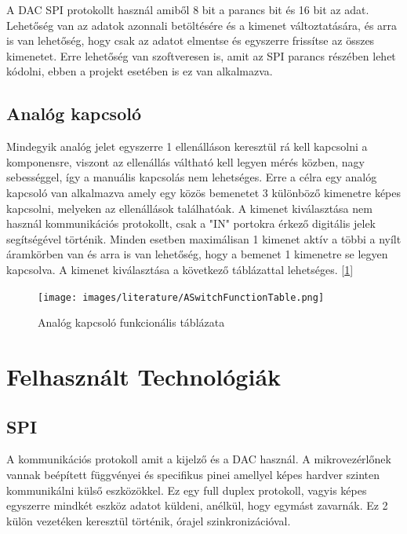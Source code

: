 A DAC SPI protokollt használ amiből 8 bit a parancs bit és 16 bit az adat.
Lehetőség van az adatok azonnali betöltésére és a kimenet változtatására, és
arra is van lehetőség, hogy csak az adatot elmentse és egyszerre frissítse az
összes kimenetet. Erre lehetőség van szoftveresen is, amit az SPI parancs
részében lehet kódolni, ebben a projekt esetében is ez van alkalmazva. 

\subsection{Analóg kapcsoló}

Mindegyik analóg jelet egyszerre 1 ellenálláson keresztül rá kell kapcsolni a komponensre,
viszont az ellenállás váltható kell legyen mérés közben, nagy sebességgel, így a manuális
kapcsolás nem lehetséges. Erre a célra egy analóg kapcsoló van alkalmazva amely egy közös
bemenetet 3 különböző kimenetre képes kapcsolni, melyeken az ellenállások találhatóak.
A kimenet kiválasztása nem használ kommunikációs protokollt, csak a "IN" portokra érkező
digitális jelek segítségével történik. Minden esetben maximálisan 1 kimenet aktív a többi
a nyílt áramkörben van és arra is van lehetőség, hogy a bemenet 1 kimenetre 
se legyen kapcsolva. A kimenet kiválasztása a következő táblázattal lehetséges.
[\ref{fig:ASwitchFuntionTable}]

\begin{figure}[h]
    \centering
    \texttt{[image: images/literature/ASwitchFunctionTable.png]}
    \caption{Analóg kapcsoló funkcionális táblázata}
    \label{fig:ASwitchFuntionTable}
\end{figure}



\section{Felhasznált Technológiák}

\subsection{SPI}

A kommunikációs protokoll amit a kijelző és a DAC használ. A mikrovezérlőnek vannak
beépített függvényei és specifikus pinei amellyel képes hardver szinten kommunikálni
külső eszközökkel. Ez egy full duplex protokoll, vagyis képes egyszerre mindkét eszköz
adatot küldeni, anélkül, hogy egymást zavarnák. Ez 2 külön vezetéken
keresztül történik, órajel szinkronizációval.

